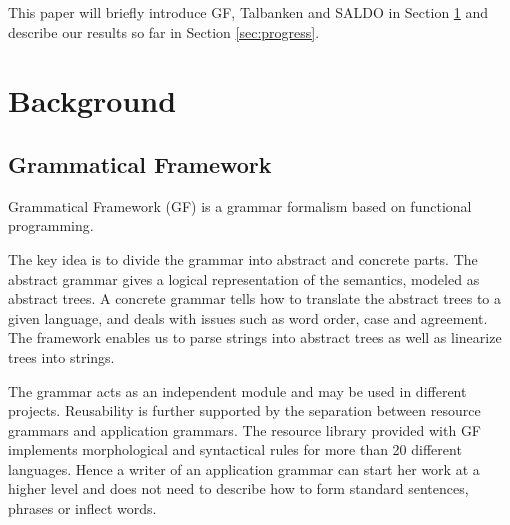 \documentclass[submission]{eptcs} %
\begin{document}
This paper will briefly introduce GF, Talbanken and SALDO in Section \ref{sec:background}
and describe our results so far in Section \ref{sec:progress}.

\section{Background}
\label{sec:background}
\subsection{Grammatical Framework}
\label{sec:gf}


Grammatical Framework\cite{ranta-2011} (GF) is a grammar formalism based on functional
programming. %

The key idea is to divide the grammar into abstract and concrete parts. %
The abstract grammar gives a logical representation of the semantics,
modeled as abstract trees.
A concrete grammar tells how to translate the abstract trees to a given language,
and deals with issues such as word order, case and agreement. 
The framework enables us to parse strings into 
abstract trees as well as linearize trees into strings.

The grammar acts as an independent module and may be used in different
projects.
Reusability is further supported by the separation between resource grammars
and application grammars. The resource library provided with GF 
implements morphological and
syntactical rules for more than 20 different languages.
Hence a writer of an application grammar can start her work at a higher
level and does not need to describe how to 
form standard sentences, phrases or inflect words.
\end{document}
